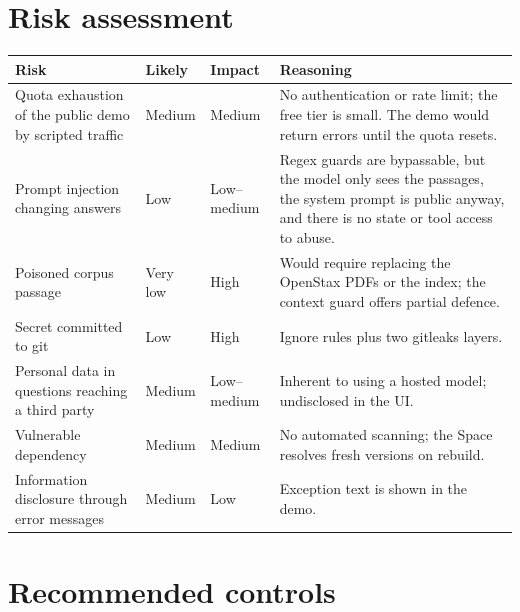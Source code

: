\section{Risk assessment}

\begin{inferred}
\begin{center}\small
\begin{tabularx}{\linewidth}{@{}>{\raggedright\arraybackslash}p{3.4cm}>{\centering\arraybackslash}p{1.6cm}>{\centering\arraybackslash}p{1.6cm}L@{}}
\toprule
\textbf{Risk} & \textbf{Likely} & \textbf{Impact} & \textbf{Reasoning}\\
\midrule
Quota exhaustion of the public demo by scripted traffic & Medium & Medium & No authentication or rate limit; the free tier is small. The demo would return errors until the quota resets.\\
Prompt injection changing answers & Low & Low--medium & Regex guards are bypassable, but the model only sees the passages, the system prompt is public anyway, and there is no state or tool access to abuse.\\
Poisoned corpus passage & Very low & High & Would require replacing the OpenStax PDFs or the index; the context guard offers partial defence.\\
Secret committed to git & Low & High & Ignore rules plus two gitleaks layers.\\
Personal data in questions reaching a third party & Medium & Low--medium & Inherent to using a hosted model; undisclosed in the UI.\\
Vulnerable dependency & Medium & Medium & No automated scanning; the Space resolves fresh versions on rebuild.\\
Information disclosure through error messages & Medium & Low & Exception text is shown in the demo.\\
\bottomrule
\end{tabularx}
\end{center}
\end{inferred}

\section{Recommended controls}


